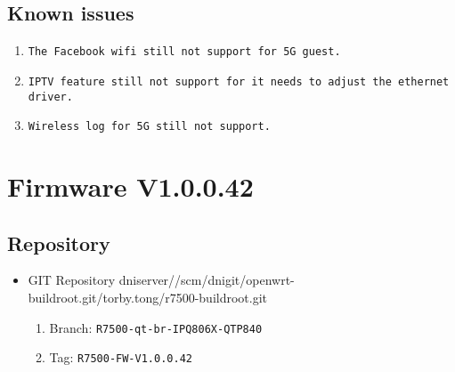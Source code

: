 \documentclass[12pt]{report}
\newcommand{\tlabel}[1]{
  \label{#1}%
  }
\begin{document}
\subsection{Known issues}
            \begin{enumerate}
		\item \texttt{The Facebook wifi still not support for 5G guest.}
		\item \texttt{IPTV feature still not support for it needs to adjust the ethernet driver.}
		\item \texttt{Wireless log for 5G still not support.}
            \end{enumerate}

\section{Firmware V1.0.0.42}

\tlabel{sec:1-0-1}
\subsection{Repository}
\begin{itemize}
	\item GIT Repository dniserver//scm/dnigit/openwrt-buildroot.git/torby.tong/r7500-buildroot.git
	\begin{enumerate}
		\item Branch: \texttt{R7500-qt-br-IPQ806X-QTP840}
                \item Tag: \texttt{R7500-FW-V1.0.0.42}
	\end{enumerate}
\end{itemize}
\end{document}
